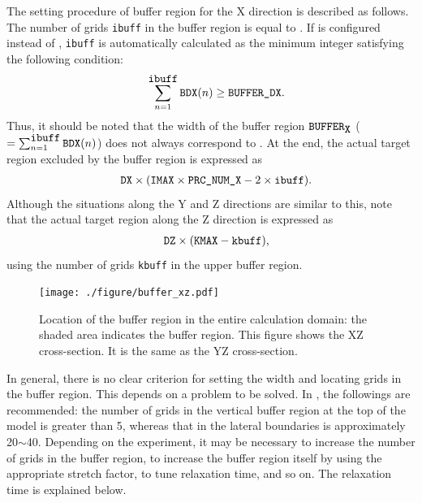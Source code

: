 The setting procedure of buffer region for the X direction is described as follows.
The number of grids \verb|ibuff| in the buffer region is equal to .
If  is configured instead of , \verb|ibuff| is automatically calculated as the minimum integer satisfying the following condition:
%
\begin{eqnarray}
   && \sum_{n=1}^{\verb|ibuff|} \verb|BDX|(n) \ge \nmitemeq{BUFFER_DX}. \nonumber
\end{eqnarray}
%
Thus, it should be noted that the width of the buffer region $\verb|BUFFER|_{\verb|X|}$ ($= \sum_{n=1}^{\verb|ibuff|} \verb|BDX|(n)$) does not always correspond to . At the end, the actual target region excluded by the buffer region is expressed as
%
\begin{eqnarray}
   && \nmitemeq{DX} \times ( \nmitemeq{IMAX} \times \nmitemeq{PRC_NUM_X} - 2 \times \verb|ibuff| ).
\end{eqnarray}
%
Although the situations along the Y and Z directions are similar to this, note that the actual target region along the Z direction is expressed as
%
\begin{eqnarray}
   && \nmitemeq{DZ} \times ( \nmitemeq{KMAX} - \verb|kbuff| ),
\end{eqnarray}
%
using the number of grids \verb|kbuff| in the upper buffer region.

\begin{figure}[t]
\begin{center}
  \texttt{[image: ./figure/buffer\_xz.pdf]}\\
  \caption{Location of the buffer region in the entire calculation domain: the shaded area indicates the buffer region. This figure shows the XZ cross-section. It is the same as the YZ cross-section.}
  \label{fig:buff_xz}
\end{center}
\end{figure}

In general, there is no clear criterion for setting the width and locating grids in the buffer region.
This depends on a problem to be solved.
In \scalerm, the followings are recommended: the number of grids in the vertical buffer region at the top of the model is greater than 5, whereas that in the lateral boundaries is approximately 20$\sim$40.
Depending on the experiment, it may be necessary to increase the number of grids in the buffer region, to increase the buffer region itself by using the appropriate stretch factor, to tune relaxation time, and so on.
The relaxation time is explained below.



